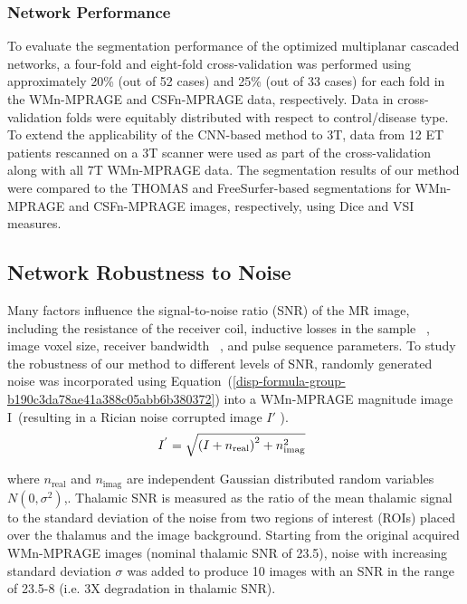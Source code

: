 \documentclass[3p,,final,12pt]{elsarticle}
\begin{document}
\subsubsection{Network Performance} To evaluate the segmentation performance of the optimized multiplanar cascaded networks, a four-fold and eight-fold cross-validation was performed using approximately 20\% (out of 52 cases) and 25\% (out of 33 cases) for each fold in the WMn-MPRAGE and CSFn-MPRAGE data, respectively. Data in cross-validation folds were equitably distributed with respect to control/disease type. To extend the applicability of the CNN-based method to 3T, data from 12 ET patients rescanned on a 3T scanner were used as part of the cross-validation along with all 7T WMn-MPRAGE data. The segmentation results of our method were compared to the THOMAS and FreeSurfer-based segmentations for WMn-MPRAGE and CSFn-MPRAGE images, respectively, using Dice and VSI measures. 



\subsection{Network Robustness to Noise}Many factors influence the signal-to-noise ratio (SNR) of the MR image, including the resistance of the receiver coil, inductive losses in the sample \unskip~\cite{1643371:26789940}, image voxel size, receiver bandwidth \unskip~\cite{1643371:26789953}, and pulse sequence parameters. To study the robustness of our method to different levels of SNR, randomly generated noise was incorporated using Equation~(\ref{disp-formula-group-b190c3da78ae41a388c05abb6b380372})  into a WMn-MPRAGE magnitude image I~(resulting in a Rician noise corrupted image $I' $ ). 
\let\saveeqnno\theequation
\let\savefrac\frac
\def\dispfrac{\displaystyle\savefrac}
\begin{eqnarray}
\let\frac\dispfrac
\gdef\theequation{5}
\let\theHequation\theequation
\label{disp-formula-group-b190c3da78ae41a388c05abb6b380372}
\begin{array}{@{}l}I^{'}=\sqrt{{\left(I+n_{\text{real}}\right)}^{2}+n_{\text{imag}}^{2}}\end{array}
\end{eqnarray}
\global\let\theequation\saveeqnno
\addtocounter{equation}{-1}\ignorespaces 
where $n_{\text{real}} $ and $n_{\text{imag}} $ are independent Gaussian distributed random variables $N(0,\sigma ^{2}) $,. Thalamic SNR is measured as the ratio of the mean thalamic signal to the standard deviation of the noise from two regions of interest (ROIs) placed over the thalamus and the image background. Starting from the original acquired WMn-MPRAGE images (nominal thalamic SNR of 23.5), noise with increasing standard deviation $\sigma $ was added to produce 10 images with an SNR in the range of 23.5-8 (i.e. {\texttildeapprox} 3X degradation in thalamic SNR).
\end{document}
